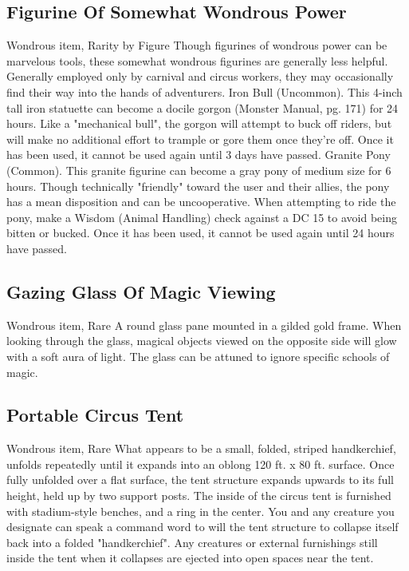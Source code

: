 \documentclass[10pt,a4paper,twoside,bg=print,twocolumn,openany,nodeprecatedcode]{dndbook}
\begin{document}
\subsection{Figurine Of Somewhat Wondrous Power}
Wondrous item, Rarity by Figure
Though figurines of wondrous power can be marvelous tools, these somewhat wondrous figurines are generally less helpful. Generally employed only by carnival and circus workers, they may occasionally find their way into the hands of adventurers.
Iron Bull (Uncommon). This 4-inch tall iron statuette can become a docile gorgon (Monster Manual, pg. 171) for 24 hours. Like a "mechanical bull", the gorgon will attempt to buck off riders, but will make no additional effort to trample or gore them once they're off. Once it has been used, it cannot be used again until 3 days have passed.
Granite Pony (Common). This granite figurine can become a gray pony of medium size for 6 hours. Though technically "friendly" toward the user and their allies, the pony has a mean disposition and can be uncooperative. When attempting to ride the pony, make a Wisdom (Animal Handling) check against a DC 15 to avoid being bitten or bucked. Once it has been used, it cannot be used again until 24 hours have passed.
\subsection{Gazing Glass Of Magic Viewing}
Wondrous item, Rare
A round glass pane mounted in a gilded gold frame. When looking through the glass, magical objects viewed on the opposite side will glow with a soft aura of light. The glass can be attuned to ignore specific schools of magic. 
\subsection{Portable Circus Tent}
Wondrous item, Rare
What appears to be a small, folded, striped handkerchief, unfolds repeatedly until it expands into an oblong 120 ft. x 80 ft. surface. Once fully unfolded over a flat surface, the tent structure expands upwards to its full height, held up by two support posts. The inside of the circus tent is furnished with stadium-style benches, and a ring in the center. You and any creature you designate can speak a command word to will the tent structure to collapse itself back into a folded "handkerchief". Any creatures or external furnishings still inside the tent when it collapses are ejected into open spaces near the tent.
\end{document}
